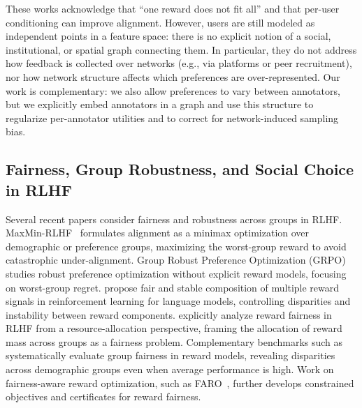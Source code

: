 \documentclass{article}
\theoremstyle{plain}
\theoremstyle{definition}
\theoremstyle{remark}
\begin{document}
These works acknowledge that “one reward does not fit all” and that per-user conditioning can improve alignment.
However, users are still modeled as independent points in a feature space: there is no explicit notion of a social, institutional, or spatial graph connecting them.
In particular, they do not address how feedback is collected over networks (e.g., via platforms or peer recruitment), nor how network structure affects which preferences are over-represented.
Our work is complementary: we also allow preferences to vary between annotators, but we explicitly embed annotators in a graph and use this structure to regularize per-annotator utilities and to correct for network-induced sampling bias.

\subsection{Fairness, Group Robustness, and Social Choice in RLHF}
\label{sec:rw_fairness}

Several recent papers consider fairness and robustness across groups in RLHF.
MaxMin-RLHF~\citep{chakraborty2024maxminrlhf} formulates alignment as a minimax optimization over demographic or preference groups, maximizing the worst-group reward to avoid catastrophic under-alignment.
Group Robust Preference Optimization (GRPO)~\citep{ramesh2024grpo} studies robust preference optimization without explicit reward models, focusing on worst-group regret.
\citet{li2024optimizing_fair_stable} propose fair and stable composition of multiple reward signals in reinforcement learning for language models, controlling disparities and instability between reward components.
\citet{ouyang2025rewardfairness} explicitly analyze reward fairness in RLHF from a resource-allocation perspective, framing the allocation of reward mass across groups as a fairness problem.
Complementary benchmarks such as \citet{song2025groupfair_rewardmodels} systematically evaluate group fairness in reward models, revealing disparities across demographic groups even when average performance is high.
Work on fairness-aware reward optimization, such as FARO~\citep{choi2025faro}, further develops constrained objectives and certificates for reward fairness.
\end{document}

